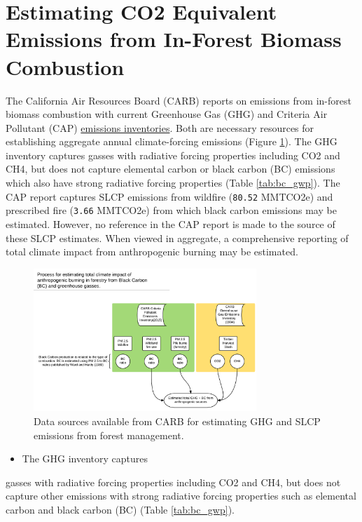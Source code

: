 \documentclass[a4paper]{article}
\begin{document}
\section{Estimating CO2 Equivalent Emissions from In-Forest Biomass Combustion}
\label{sec-2}


The California Air Resources Board (CARB) reports on
emissions from in-forest biomass combustion with current Greenhouse Gas (GHG) and Criteria Air
Pollutant (CAP) 
\href{http://www.arb.ca.gov/ei/ei.htm}{emissions inventories}. Both are necessary resources for establishing
aggregate annual climate-forcing emissions (Figure \ref{fig:burn_diag}). The GHG inventory captures
gasses with radiative forcing properties including CO2 and CH4, but does not capture elemental
carbon or black carbon (BC) emissions which also have strong radiative
forcing properties (Table \ref{tab:bc_gwp}). The \citet{CaliforniaAirResourcesBoard2015,CaliforniaAirResourcesBoard2016}
CAP report captures SLCP emissions from wildfire
(\texttt{80.52} MMTCO2e) and prescribed fire
(\texttt{3.66} MMTCO2e) from which black carbon emissions may be estimated. However, no reference in the CAP report is made to the source of these
SLCP estimates. When viewed in aggregate, a comprehensive reporting of total climate impact from anthropogenic burning may be estimated. 


\begin{figure}[htb]
\centering
\includegraphics[width=0.75\textwidth]{./graphics/burning.pdf}
\caption{Data sources available from CARB for estimating GHG and SLCP emissions from forest management. \label{fig:burn_diag}}
\end{figure}

\begin{itemize}
\item The GHG inventory captures
\end{itemize}
gasses with radiative forcing properties including CO2 and CH4, but does
not capture other emissions with strong radiative forcing properties such as elemental
carbon and black carbon (BC) (Table \ref{tab:bc_gwp}). 
\end{document}
